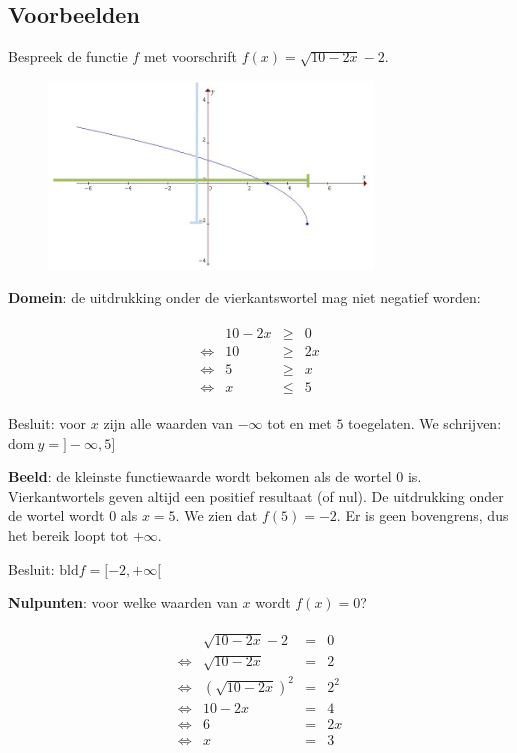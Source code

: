 \subsection{Voorbeelden}



\begin{voorbeeld}
	Bespreek de functie $f$ met voorschrift $f(x)=\sqrt{10-2x}-2$.

\begin{figure}[h]
	\centering{}\includegraphics[height=5cm]{2_elem_rekenvaardigheden_B/inputs/reeel_vb1.jpg} 
\end{figure}


\textbf{Domein}: de uitdrukking onder de vierkantswortel
mag niet negatief worden:


\begin{eqnarray*}
	\begin{array}{cccc}
		& 10-2x & \geqslant & 0\\
		\iff & 10 & \geqslant & 2x\\
		\iff & 5 & \geqslant & x\\
		\iff & x & \leqslant & 5
	\end{array}
\end{eqnarray*}


Besluit: voor $x$ zijn alle waarden van $-\infty$ tot
en met $5$ toegelaten. We schrijven: $\textrm{dom}\ y=]-\infty,5]$ 

\textbf{Beeld}: de kleinste functiewaarde wordt
bekomen als de wortel $0$ is. Vierkantwortels geven altijd een positief
resultaat (of nul). De uitdrukking onder de wortel wordt $0$ als
$x=5$. We zien dat $f(5)=-2$. Er is geen bovengrens, dus het bereik
loopt tot $+\infty$.

Besluit: $\textrm{bld}f=[-2,+\infty[$




\textbf{Nulpunten}: voor welke waarden van $x$ wordt $f(x)=0$?


\begin{eqnarray*}
	\begin{array}{cccc}
		& \sqrt{10-2x}-2 & = & 0\\
		\iff & \sqrt{10-2x} & = & 2\\
		\iff & \left(\sqrt{10-2x}\right)^{2} & = & 2^{2}\\
		\iff & 10-2x & = & 4\\
		\iff & 6 & = & 2x\\
		\iff & x & = & 3
	\end{array}
\end{eqnarray*}



\end{voorbeeld}
